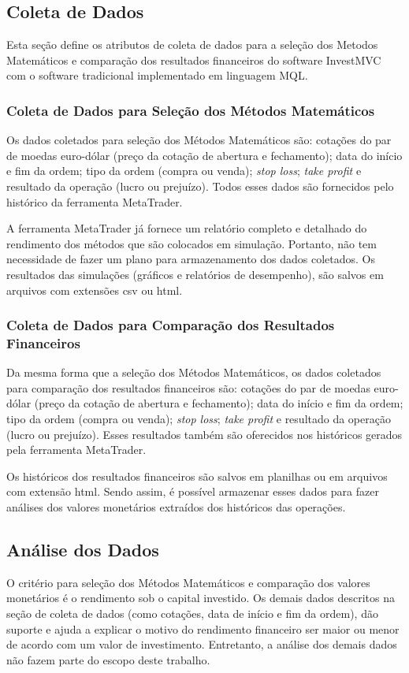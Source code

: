 \subsection{Coleta de Dados}
\label{sec:coletaDeDados}
Esta seção define os atributos de coleta de dados para a seleção dos Metodos Matemáticos e comparação dos resultados financeiros do software InvestMVC com o software tradicional implementado em linguagem MQL.

\subsubsection{Coleta de Dados para Seleção dos Métodos Matemáticos}
Os dados coletados para seleção dos Métodos Matemáticos são: cotações do par de moedas euro-dólar (preço da cotação de abertura e fechamento); data do início e fim da ordem; tipo da ordem (compra ou venda); \textit{stop loss}; \textit{take profit} e resultado da operação (lucro ou prejuízo). Todos esses dados são fornecidos pelo histórico da ferramenta MetaTrader.

A ferramenta MetaTrader já fornece um relatório completo e detalhado do rendimento dos métodos que são colocados em simulação. Portanto, não tem necessidade de fazer um plano para armazenamento dos dados coletados. Os resultados das simulações (gráficos e relatórios de desempenho), são salvos em arquivos com extensões csv ou html.

\subsubsection{Coleta de Dados para Comparação dos Resultados Financeiros}
Da mesma forma que a seleção dos Métodos Matemáticos, os dados coletados para comparação dos resultados financeiros são: cotações do par de moedas euro-dólar (preço da cotação de abertura e fechamento); data do início e fim da ordem; tipo da ordem (compra ou venda); \textit{stop loss}; \textit{take profit} e resultado da operação (lucro ou prejuízo). Esses resultados também são oferecidos nos históricos gerados pela ferramenta MetaTrader.

Os históricos dos resultados financeiros são salvos em planilhas ou em arquivos com extensão html. Sendo assim, é possível armazenar esses dados para fazer análises dos valores monetários extraídos dos históricos das operações.

\subsection{Análise dos Dados}
O critério para seleção dos Métodos Matemáticos e comparação dos valores monetários é o rendimento sob o capital investido. Os demais dados descritos na seção de coleta de dados (como cotações, data de início e fim da ordem), dão suporte e ajuda a explicar o motivo do rendimento financeiro ser maior ou menor de acordo com um valor de investimento. Entretanto, a análise dos demais dados não fazem parte do escopo deste trabalho.

